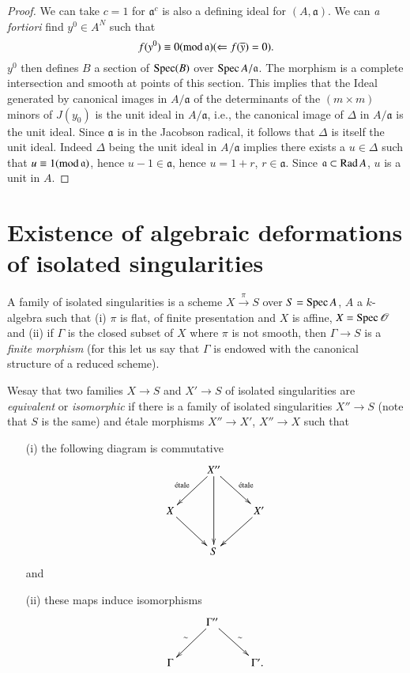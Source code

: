 \begin{proof}
We can take $c=1$ for $\mathfrak{a}^{c}$ is also a defining ideal for
$(A,\mathfrak{a})$. We can {\em a fortiori} find $y^{0}\in A^{N}$ such
that
$$
f(y^{0})\equiv 0(\text{mod\,}\mathfrak{a})(\Leftarrow
f(\overline{y})=0).
$$
$y^{0}$ then defines $B$ a section of $\operatorname{Spec} (B)$ over $\operatorname{Spec}
A/\mathfrak{a}$. The morphism is a complete intersection and smooth at
points of this section. This implies that the Ideal generated by
canonical images in $A/\mathfrak{a}$ of the determinants of the
$(m\times m)$ minors of $J(y_{0})$ is the unit ideal in
$A/\mathfrak{a}$, i.e., the canonical image of $\Delta$ in
$A/\mathfrak{a}$ is the unit ideal. Since $\mathfrak{a}$ is in the
Jacobson radical, it follows that $\Delta$ is itself the unit
ideal. Indeed $\Delta$ being the unit ideal in $A/\mathfrak{a}$
implies there exists a $u\in \Delta$ such that $u\equiv
1(\text{mod\,}\mathfrak{a})$, hence $u-1\in \mathfrak{a}$, hence
$u=1+r$, $r\in \mathfrak{a}$. Since $\mathfrak{a}\subset \operatorname{Rad} A$, $u$
is a unit in $A$.
\end{proof}

\section[Existence of algebraic deformations of isolated...]{Existence
of algebraic deformations of isolated\hfil\break 
  singularities}\label{part2-sec5} 

\begin{definition}\label{part2-defi5.1}
A family of isolated singularities is a scheme $X\xrightarrow{\pi}S$
over $S=\operatorname{Spec} A$, $A$ a $k$-algebra such that (i) $\pi$ is flat, of
finite presentation and $X$ is affine, $X=\operatorname{Spec} \mathscr{O}$ and (ii)
if $\Gamma$ is the closed subset of $X$ where $\pi$ is not smooth,
then $\Gamma\to S$ is a {\em finite morphism} (for this let us say
that $\Gamma$ is endowed with the canonical structure of a reduced
scheme). 
\end{definition}

\begin{definition}\label{part2-defi5.2}
We\pageoriginale say that two families $X\to S$ and $X'\to S$ of isolated
singularities are {\em equivalent} or {\em isomorphic} if there is a
family of isolated singularities $X''\to S$ (note that $S$ is the
same) and \'etale morphisms $X''\to X'$, $X''\to X$ such that
\begin{itemize}
\item[(i)] the following diagram is commutative
\[
\xymatrix{
 & X''\ar[dl]_{\text{\'etale}}\ar[dr]^{\text{\'etale}}\ar[dd] & \\
X\ar[dr] & & X'\ar[dl]\\
 & S &
}
\]
and

\item[(ii)] these maps induce isomorphisms
\[
\xymatrix{
 & \Gamma''\ar[dl]_{\sim}\ar[dr]^{\sim} &\\
\Gamma & & \Gamma'.
}
\]
\end{itemize}
\end{definition}

